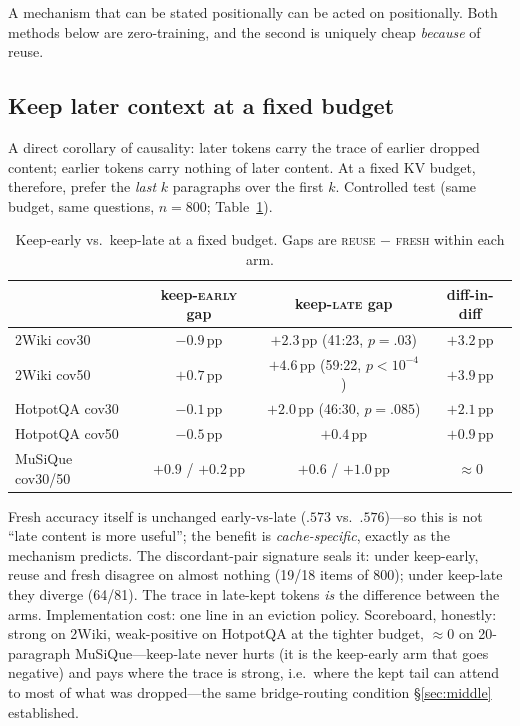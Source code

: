 \documentclass{article} %
\newcommand{\pp}{\,\mathrm{pp}}
\newcommand{\fresh}{\textsc{fresh}}
\newcommand{\reuse}{\textsc{reuse}}
\begin{document}
A mechanism that can be stated positionally can be acted on positionally. Both methods below are zero-training, and the second is uniquely cheap \emph{because} of reuse.

\subsection{Keep later context at a fixed budget}
\label{sec:keeplate}

A direct corollary of causality: later tokens carry the trace of earlier dropped content; earlier tokens carry nothing of later content. At a fixed KV budget, therefore, prefer the \emph{last} $k$ paragraphs over the first $k$. Controlled test (same budget, same questions, $n=800$; Table~\ref{tab:keeplate}).

\begin{table}[t]
\centering
\caption{Keep-early vs.\ keep-late at a fixed budget. Gaps are \reuse{} $-$ \fresh{} within each arm.}
\label{tab:keeplate}
\begin{tabular}{lccc}
\toprule
& keep-\textsc{early} gap & keep-\textsc{late} gap & diff-in-diff \\
\midrule
2Wiki cov30 & $-0.9\pp$ & $\mathbf{+2.3}\pp$ {\scriptsize(41:23, $p{=}.03$)} & $+3.2\pp$ \\
2Wiki cov50 & $+0.7\pp$ & $\mathbf{+4.6}\pp$ {\scriptsize(59:22, $p{<}10^{-4}$)} & $+3.9\pp$ \\
HotpotQA cov30 & $-0.1\pp$ & $\mathbf{+2.0}\pp$ {\scriptsize(46:30, $p{=}.085$)} & $+2.1\pp$ \\
HotpotQA cov50 & $-0.5\pp$ & $+0.4\pp$ & $+0.9\pp$ \\
MuSiQue cov30/50 & $+0.9$ / $+0.2\pp$ & $+0.6$ / $+1.0\pp$ & $\approx 0$ \\
\bottomrule
\end{tabular}
\end{table}

Fresh accuracy itself is unchanged early-vs-late ($.573$ vs.\ $.576$)---so this is not ``late content is more useful''; the benefit is \emph{cache-specific}, exactly as the mechanism predicts. The discordant-pair signature seals it: under keep-early, reuse and fresh disagree on almost nothing (19/18 items of 800); under keep-late they diverge (64/81). The trace in late-kept tokens \emph{is} the difference between the arms. Implementation cost: one line in an eviction policy. Scoreboard, honestly: strong on 2Wiki, weak-positive on HotpotQA at the tighter budget, $\approx 0$ on 20-paragraph MuSiQue---keep-late never hurts (it is the keep-early arm that goes negative) and pays where the trace is strong, i.e.\ where the kept tail can attend to most of what was dropped---the same bridge-routing condition \S\ref{sec:middle} established.
\end{document}
